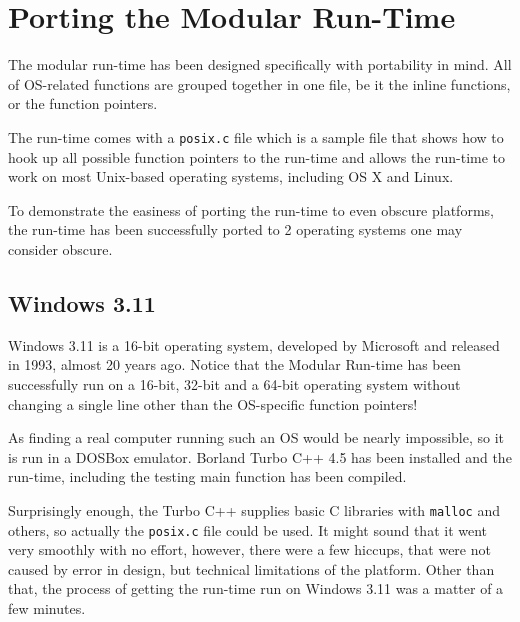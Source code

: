 \chapter{Porting the Modular Run-Time}

The modular run-time has been designed specifically with portability in mind. All of OS-related functions are grouped together in one file, be it the inline functions, or the function pointers.

The run-time comes with a \verb=posix.c= file which is a sample file that shows how to hook up all possible function pointers to the run-time and allows the run-time to work on most Unix-based operating systems, including OS X and Linux.

To demonstrate the easiness of porting the run-time to even obscure platforms, the run-time has been successfully ported to 2 operating systems one may consider obscure.

\section{Windows 3.11}

Windows 3.11 is a 16-bit operating system, developed by Microsoft and released in 1993, almost 20 years ago. Notice that the Modular Run-time has been successfully run on a 16-bit, 32-bit and a 64-bit operating system without changing a single line other than the OS-specific function pointers!

As finding a real computer running such an OS would be nearly impossible, so it is run in a DOSBox emulator. Borland Turbo C++ 4.5 has been installed and the run-time, including the testing main function has been compiled.

Surprisingly enough, the Turbo C++ supplies basic C libraries with \verb=malloc= and others, so actually the \verb=posix.c= file could be used. It might sound that it went very smoothly with no effort, however, there were a few hiccups, that were not caused by error in design, but technical limitations of the platform. Other than that, the process of getting the run-time run on Windows 3.11 was a matter of a few minutes.

